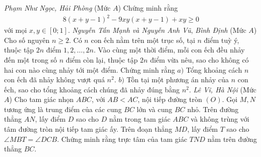 \begin{multicols}{2}
\begin{figure}[H]
		\vspace*{-10pt}
	\end{figure}
	\hfill\textit{Phạm Như Ngọc, Hải Phòng}
	\vskip 0.1cm
	{}
	(Mức $A$) Chứng minh rằng
	\begin{align*}
		8(x+y-1)^2-9xy(x+y-1)+xy\ge0
	\end{align*}
	với mọi $x,y\in[0;1]$. 
	\vskip 0.1cm
		\hfill\textit{Nguyễn Tấn Mạnh và Nguyễn Anh Vũ}, 
		\vskip 0.01cm
		\hfill \textit{Bình Định}
	\vskip 0.1cm
	{}
	(Mức $A$) Cho số nguyên $n\ge2$. Có $n$ con ếch nằm trên một trục số, tại $n$ điểm tuỳ ý, thuộc tập $2n$ điểm $1,2,\ldots,2n$. Vào cùng một thời điểm, mỗi con ếch đều nhảy đến một trong số $n$ điểm còn lại, thuộc tập $2n$ điểm vừa nêu, sao cho không có hai con nào cùng nhảy tới một điểm. Chứng minh rằng
	\vskip 0.05cm
	$a)$ Tổng khoảng cách $n$ con ếch đã nhảy không vượt quá $n^2$. 
	\vskip 0.05cm
	$b)$ Tồn tại một phương án nhảy của $n$ con ếch, sao cho tổng khoảng cách chúng đã nhảy đúng bằng $n^2$. 
	\vskip 0.1cm
	\hfill	\textit{Lê Vĩ, Hà Nội}
	\vskip 0.1cm
	{}
	(Mức $A$) Cho tam giác nhọn $ABC$, với $AB<AC$, nội tiếp đường tròn $(O)$. Gọi $M,N$ tương ứng là trung điểm của các cung $BC$ lớn và cung $BC$ nhỏ. Trên đường thẳng $AN$, lấy điểm $D$ sao cho $D$ nằm trong tam giác $ABC$ và không trùng với tâm đường tròn nội tiếp tam giác ấy. Trên đoạn thẳng $MD$, lấy điểm $T$ sao cho $\angle{MBT}=\angle{DCB}$. Chứng minh rằng trực tâm của tam giác $TND$ nằm trên đường thẳng $BC$.
	\begin{figure}[H]

\end{figure}
\end{multicols}
